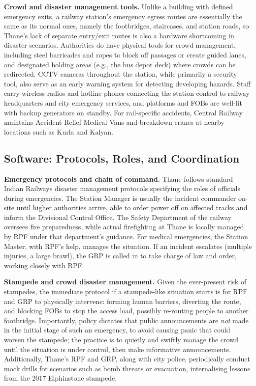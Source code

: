 \documentclass[11pt]{article}
\begin{document}
\textbf{Crowd and disaster management tools.} Unlike a building with defined emergency exits, a
railway station's emergency egress routes are essentially the same as its normal ones, namely the
footbridges, staircases, and station roads, so Thane's lack of separate entry/exit routes is
also a hardware shortcoming in disaster scenarios. Authorities do have physical tools for crowd
management, including steel barricades and ropes to block off passages or create guided lanes,
and designated holding areas (e.g., the bus depot deck) where crowds can be redirected. CCTV
cameras throughout the station, while primarily a security tool, also serve as an early warning
system for detecting developing hazards. Staff carry wireless radios and hotline phones
connecting the station control to railway headquarters and city emergency services, and
platforms and FOBs are well-lit with backup generators on standby. For rail-specific accidents,
Central Railway maintains Accident Relief Medical Vans and breakdown cranes at nearby locations
such as Kurla and Kalyan.

\subsection{Software: Protocols, Roles, and Coordination}

\textbf{Emergency protocols and chain of command.} Thane follows standard Indian Railways
disaster management protocols specifying the roles of officials during emergencies. The Station
Manager is usually the incident commander on-site until higher authorities arrive, able to order
power off on affected tracks and inform the Divisional Control Office. The Safety Department of
the railway oversees fire preparedness, while actual firefighting at Thane is locally managed by
RPF under that department's guidance. For medical emergencies, the Station Master, with RPF's
help, manages the situation. If an incident escalates (multiple injuries, a large brawl), the
GRP is called in to take charge of law and order, working closely with RPF.

\textbf{Stampede and crowd disaster management.} Given the ever-present risk of stampedes, the
immediate protocol if a stampede-like situation starts is for RPF and GRP to physically
intervene: forming human barriers, diverting the route, and blocking FOBs to stop the access
load, possibly re-routing people to another footbridge. Importantly, policy dictates that public
announcements are \emph{not} made in the initial stage of such an emergency, to avoid causing
panic that could worsen the stampede; the practice is to quietly and swiftly manage the crowd
until the situation is under control, then make informative announcements. Additionally,
Thane's RPF and GRP, along with city police, periodically conduct mock drills for scenarios such
as bomb threats or evacuation, internalising lessons from the 2017 Elphinstone stampede.
\end{document}
